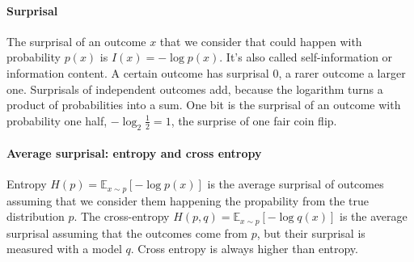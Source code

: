 

\paragraph{Surprisal}\label{sec:surprisal}
The surprisal of an outcome \(x\) that we consider that could happen with probability \(p(x)\) is \(I(x)=-\log p(x)\).
It's also called self-information or information content.
A certain outcome has surprisal 0, a rarer outcome a larger one.
Surprisals of independent outcomes add, because the logarithm turns a product of probabilities into a sum.
One bit is the surprisal of an outcome with probability one half, \(-\log_2\tfrac12=1\), the surprise of one fair coin flip.

\paragraph{Average surprisal: entropy and cross entropy}\label{sec:average-surprisal}
Entropy \(H(p)=\mathbb{E}_{x\sim p}[-\log p(x)]\) is the average surprisal of outcomes assuming that we consider them happening the propability from the true distribution \(p\).
The cross-entropy \(H(p,q)=\mathbb{E}_{x\sim p}[-\log q(x)]\) is the average surprisal assuming that the outcomes come from \(p\), but their surprisal is measured with a model \(q\).
Cross entropy is always higher than entropy.

